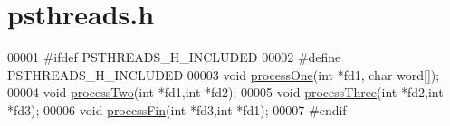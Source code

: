 \hypertarget{psthreads_8h_source}{\section{psthreads.\-h}
}

\begin{DoxyCode}
00001 \textcolor{preprocessor}{#ifdef PSTHREADS\_H\_INCLUDED}
00002 \textcolor{preprocessor}{}\textcolor{preprocessor}{#define PSTHREADS\_H\_INCLUDED}
00003 \textcolor{preprocessor}{}\textcolor{keywordtype}{void} \hyperlink{psthreads_8c_ad770c3fce36513614f685761ab978c84}{processOne}(\textcolor{keywordtype}{int} *fd1, \textcolor{keywordtype}{char} word[]);
00004 \textcolor{keywordtype}{void} \hyperlink{psthreads_8c_a41286be8a60549556fd52a785e55ceb3}{processTwo}(\textcolor{keywordtype}{int} *fd1,\textcolor{keywordtype}{int} *fd2);
00005 \textcolor{keywordtype}{void} \hyperlink{psthreads_8c_aa9e93a11d641259d16a36df89c644d00}{processThree}(\textcolor{keywordtype}{int} *fd2,\textcolor{keywordtype}{int} *fd3);
00006 \textcolor{keywordtype}{void} \hyperlink{psthreads_8c_ad4fbf5e28b0ec1a60e850f9f1887c615}{processFin}(\textcolor{keywordtype}{int} *fd3,\textcolor{keywordtype}{int} *fd1);
00007 \textcolor{preprocessor}{#endif}
\end{DoxyCode}
